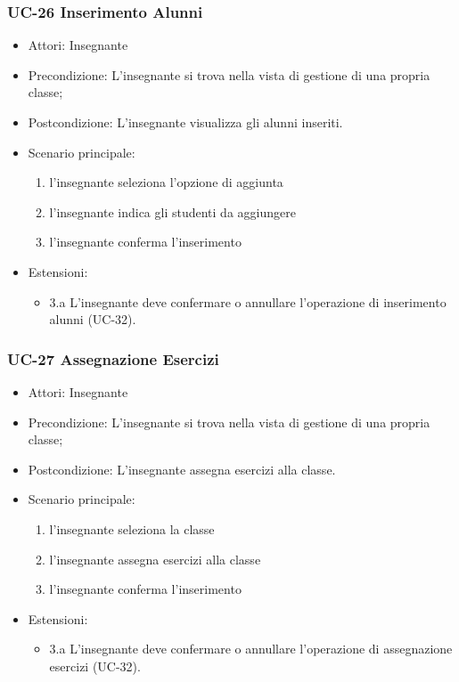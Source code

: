 \subsubsection{UC-26 Inserimento Alunni}
\begin{itemize}
	\item Attori: Insegnante
	\item Precondizione: L'insegnante si trova nella vista di gestione di una propria classe;
	\item Postcondizione: L'insegnante visualizza gli alunni inseriti.
	\item Scenario principale:
	\begin{enumerate}
		\item l'insegnante seleziona l'opzione di aggiunta
		\item l'insegnante indica gli studenti da aggiungere
		\item l'insegnante conferma l'inserimento
	\end{enumerate}
\item Estensioni:
\begin{itemize}
	\item 3.a L'insegnante deve confermare o annullare l'operazione di inserimento alunni (UC-32).
\end{itemize}
\end{itemize}

\subsubsection{UC-27 Assegnazione Esercizi}
\begin{itemize}
	\item Attori: Insegnante
	\item Precondizione: L'insegnante si trova nella vista di gestione di una propria classe;
	\item Postcondizione: L'insegnante assegna esercizi alla classe.
	\item Scenario principale:
	\begin{enumerate}
		\item l'insegnante seleziona la classe
		\item l'insegnante assegna esercizi alla classe
		\item l'insegnante conferma l'inserimento
	\end{enumerate}
\item Estensioni:
\begin{itemize}
	\item 3.a L'insegnante deve confermare o annullare l'operazione di assegnazione esercizi (UC-32).
\end{itemize}
\end{itemize}



